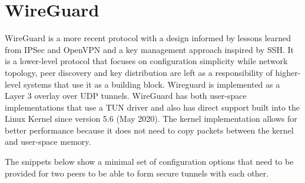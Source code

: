 \hypertarget{wireguard}{%
\section{WireGuard}\label{wireguard}}

WireGuard \autocite{donenfeldWireGuardNextGeneration2017} is a more
recent protocol with a design informed by lessons learned from IPSec and
OpenVPN and a key management approach inspired by SSH. It is a
lower-level protocol that focuses on configuration simplicity while
network topology, peer discovery and key distribution are left as a
responsibility of higher-level systems that use it as a building block.
Wireguard is implemented as a Layer 3 overlay over UDP tunnels.
WireGuard has both user-space implementations that use a TUN driver and
also has direct support built into the Linux Kernel since version 5.6
(May 2020). The kernel implementation allows for better performance
because it does not need to copy packets between the kernel and
user-space memory.

The snippets below show a minimal set of configuration options that need
to be provided for two peers to be able to form secure tunnels with each
other.

\begin{Shaded}
\begin{Highlighting}[]
\KeywordTok{[Interface]}
\OtherTok{=}
\OtherTok{=}\StringTok{ }
\OtherTok{=}

\KeywordTok{[Peer]}
\OtherTok{=}
\OtherTok{=}
\OtherTok{=}
\end{Highlighting}
\end{Shaded}

\begin{Shaded}
\begin{Highlighting}[]
\KeywordTok{[Interface]}
\OtherTok{=}
\OtherTok{=}\StringTok{ }
\OtherTok{=}

\KeywordTok{[Peer]}
\OtherTok{=}
\OtherTok{=}
\end{Highlighting}
\end{Shaded}

